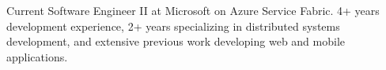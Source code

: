 

\begin{cvparagraph}

Current Software Engineer II at Microsoft on Azure Service Fabric. 4+ years development experience, 2+ years specializing in distributed systems development, and extensive previous work developing web and mobile applications.
\end{cvparagraph}
